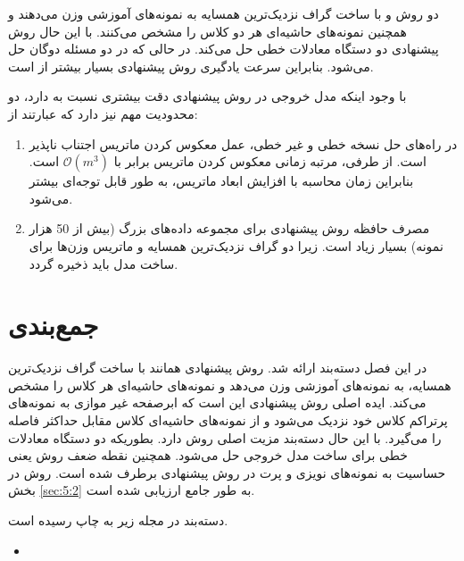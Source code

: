 دو روش  و  با ساخت گراف نزدیک‌ترین همسایه به نمونه‌های آموزشی وزن می‌دهند و همچنین نمونه‌های حاشیه‌ای هر دو کلاس را مشخص می‌کنند. با این حال روش پیشنهادی دو دستگاه معادلات خطی حل می‌کند. در حالی که در  دو مسئله دوگان حل می‌شود. بنابراین سرعت یادگیری روش پیشنهادی بسیار بیشتر از  است.

با وجود اینکه مدل خروجی در روش پیشنهادی دقت بیشتری نسبت به  دارد، دو محدودیت مهم نیز دارد که عبارتند از:
\begin{enumerate}
	\item در راه‌های حل نسخه خطی و غیر خطی، عمل معکوس کردن ماتریس اجتناب ناپذیر است. از طرفی، مرتبه زمانی معکوس کردن ماتریس برابر با  $\mathcal{O}({{m}^{3}})$ است. بنابراین زمان محاسبه با افزایش ابعاد ماتریس، به طور قابل توجه‌ای بیشتر می‌شود.
	\item مصرف حافظه روش پیشنهادی برای مجموعه داده‌های بزرگ (بیش از 50 هزار نمونه) بسیار زیاد است. زیرا دو گراف نزدیک‌ترین همسایه و ماتریس وزن‌ها برای ساخت مدل باید ذخیره گردد.
\end{enumerate}

\section{جمع‌بندی}\label{sec:3:5}
در این فصل دسته‌بند  ارائه شد. روش پیشنهادی همانند  با ساخت گراف نزدیک‌ترین همسایه، به نمونه‌های آموزشی وزن می‌دهد و نمونه‌های حاشیه‌ای هر کلاس را مشخص می‌کند. ایده اصلی روش پیشنهادی این است که ابرصفحه غیر موازی به نمونه‌های پرتراکم کلاس خود نزدیک می‌شود و از نمونه‌های حاشیه‌ای کلاس مقابل حداکثر فاصله را می‌گیرد. با این حال دسته‌بند  مزیت اصلی روش  دارد. بطوریکه دو دستگاه معادلات خطی برای ساخت مدل خروجی حل می‌شود. همچنین نقطه ضعف روش  یعنی حساسیت به نمونه‌های نویزی و پرت در روش پیشنهادی برطرف شده است. روش  در بخش \ref{sec:5:2} به طور جامع ارزیابی شده است.

دسته‌بند  در مجله زیر به چاپ رسیده است.
\begin{LTR}
\begin{itemize}[label=$\bullet$]
	\item {}
\end{itemize}
\end{LTR}
